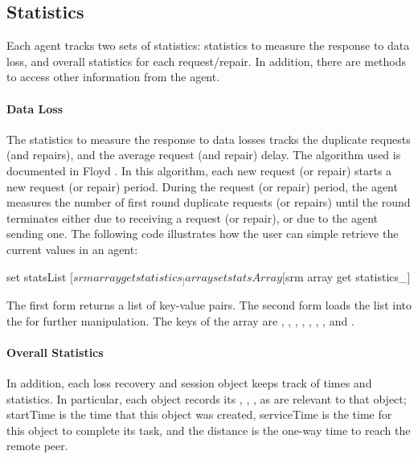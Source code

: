 \subsection{Statistics}
Each agent tracks two sets of statistics:
statistics to measure the response to data loss,
and overall statistics for each request/repair.
In addition, there are methods to access other
information from the agent.

\paragraph{Data Loss}
The statistics to measure the response to data losses
tracks the duplicate requests (and repairs),
and the average request (and repair) delay.
The algorithm used is documented in Floyd \etal \cite{Floy95:Reliable}.
In this algorithm,
each new request (or repair) starts a new request (or repair) period.
During the request (or repair) period, the agent measures
the number of first round duplicate requests (or repairs)
until the round terminates either due to receiving a request (or
repair), or due to the agent sending one.
The following code illustrates how the user can simple retrieve the
current values in an agent:
\begin{program}
                set statsList [$srm array get statistics_]
                array set statsArray [$srm array get statistics_]
\end{program}
The first form returns a list of key-value pairs.
The second form loads the list into the  for further manipulation.
The keys of the array are
, , , ,
, , , and .

\paragraph{Overall Statistics}
In addition, each loss recovery and session object keeps track of
times and statistics.
In particular, each object records its
, , , as are relevant to that object;
startTime is the time that this object was created,
serviceTime is the time for this object to complete its task, and the
distance is the one-way time to reach the remote peer.

